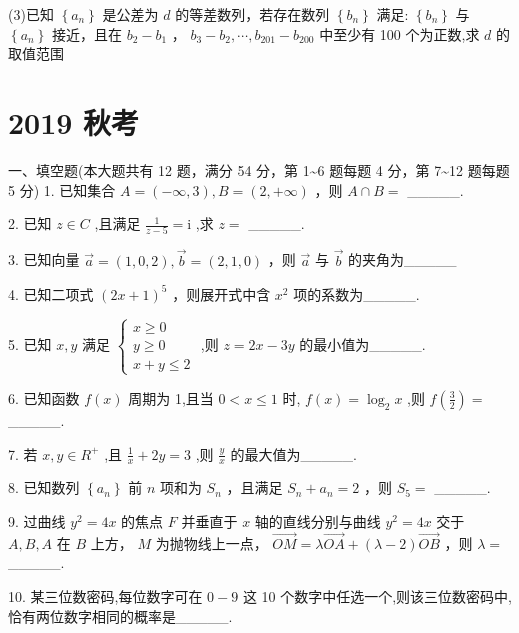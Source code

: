 \documentclass[10pt]{article}
\begin{document}
(3)已知 \(\left\{  {a}_{n}\right\}\) 是公差为 \(d\) 的等差数列，若存在数列 \(\left\{  {b}_{n}\right\}\) 满足: \(\left\{  {b}_{n}\right\}\) 与 \(\left\{  {a}_{n}\right\}\) 接近，且在 \({b}_{2} - {b}_{1}\) ， \({b}_{3} - {b}_{2},\cdots ,{b}_{201} - {b}_{200}\) 中至少有 100 个为正数,求 \(d\) 的取值范围

\section*{2019 秋考}

一、填空题(本大题共有 12 题，满分 54 分，第 1\textasciitilde 6 题每题 4 分，第 7\textasciitilde 12 题每题 5 分) 1. 已知集合 \(A = \left( {-\infty ,3}\right) ,B = \left( {2, + \infty }\right)\) ，则 \(A \cap  B =\) \_\_\_\_\_.

2. 已知 \(z \in  C\) ,且满足 \(\frac{1}{z - 5} = \mathrm{i}\) ,求 \(z =\) \_\_\_\_\_.

3. 已知向量 \(\overrightarrow{a} = \left( {1,0,2}\right) ,\overrightarrow{b} = \left( {2,1,0}\right)\) ，则 \(\overrightarrow{a}\) 与 \(\overrightarrow{b}\) 的夹角为\_\_\_\_\_

4. 已知二项式 \({\left( 2x + 1\right) }^{5}\) ，则展开式中含 \({x}^{2}\) 项的系数为\_\_\_\_\_.

5. 已知 \(x,y\) 满足 \(\left\{  \begin{array}{l} x \geq  0 \\  y \geq  0 \\  x + y \leq  2 \end{array}\right.\) ,则 \(z = {2x} - {3y}\) 的最小值为\_\_\_\_\_.

6. 已知函数 \(f\left( x\right)\) 周期为 1,且当 \(0 < x \leq  1\) 时, \(f\left( x\right)  = {\log }_{2}x\) ,则 \(f\left( \frac{3}{2}\right)  =\) \_\_\_\_\_.

7. 若 \(x,y \in  {R}^{ + }\) ,且 \(\frac{1}{x} + {2y} = 3\) ,则 \(\frac{y}{x}\) 的最大值为\_\_\_\_\_.

8. 已知数列 \(\left\{  {a}_{n}\right\}\) 前 \(n\) 项和为 \({S}_{n}\) ，且满足 \({S}_{n} + {a}_{n} = 2\) ，则 \({S}_{5} =\) \_\_\_\_\_.

9. 过曲线 \({y}^{2} = {4x}\) 的焦点 \(F\) 并垂直于 \(x\) 轴的直线分别与曲线 \({y}^{2} = {4x}\) 交于 \(A,B,A\) 在 \(B\) 上方， \(M\) 为抛物线上一点， \(\overrightarrow{OM} = \lambda \overrightarrow{OA} + \left( {\lambda  - 2}\right) \overrightarrow{OB}\) ，则 \(\lambda  =\) \_\_\_\_\_.

10. 某三位数密码,每位数字可在 \(0 - 9\) 这 10 个数字中任选一个,则该三位数密码中,恰有两位数字相同的概率是\_\_\_\_\_.
\end{document}
